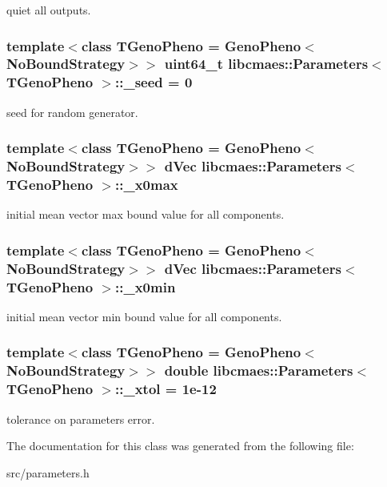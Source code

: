 quiet all outputs. \hypertarget{classlibcmaes_1_1Parameters_ac6d616c3d5295fec8a0b230592fb767a}{
\subsubsection[{\-\_\-seed}]{\setlength{\rightskip}{0pt plus 5cm}template$<$class T\-Geno\-Pheno = Geno\-Pheno$<$\-No\-Bound\-Strategy$>$$>$ uint64\-\_\-t {\bf libcmaes\-::\-Parameters}$<$ T\-Geno\-Pheno $>$\-::\-\_\-seed = 0}}\label{classlibcmaes_1_1Parameters_ac6d616c3d5295fec8a0b230592fb767a}
seed for random generator. \hypertarget{classlibcmaes_1_1Parameters_aece9694af9bee78bb13b0994db7ac45e}{
\subsubsection[{\-\_\-x0max}]{\setlength{\rightskip}{0pt plus 5cm}template$<$class T\-Geno\-Pheno = Geno\-Pheno$<$\-No\-Bound\-Strategy$>$$>$ d\-Vec {\bf libcmaes\-::\-Parameters}$<$ T\-Geno\-Pheno $>$\-::\-\_\-x0max}}\label{classlibcmaes_1_1Parameters_aece9694af9bee78bb13b0994db7ac45e}
initial mean vector max bound value for all components. \hypertarget{classlibcmaes_1_1Parameters_aa3bb27467698d9cb7fc7e0a83b48800f}{
\subsubsection[{\-\_\-x0min}]{\setlength{\rightskip}{0pt plus 5cm}template$<$class T\-Geno\-Pheno = Geno\-Pheno$<$\-No\-Bound\-Strategy$>$$>$ d\-Vec {\bf libcmaes\-::\-Parameters}$<$ T\-Geno\-Pheno $>$\-::\-\_\-x0min}}\label{classlibcmaes_1_1Parameters_aa3bb27467698d9cb7fc7e0a83b48800f}
initial mean vector min bound value for all components. \hypertarget{classlibcmaes_1_1Parameters_aaa9e8eedba7d7140d116163b40f653f8}{
\subsubsection[{\-\_\-xtol}]{\setlength{\rightskip}{0pt plus 5cm}template$<$class T\-Geno\-Pheno = Geno\-Pheno$<$\-No\-Bound\-Strategy$>$$>$ double {\bf libcmaes\-::\-Parameters}$<$ T\-Geno\-Pheno $>$\-::\-\_\-xtol = 1e-\/12}}\label{classlibcmaes_1_1Parameters_aaa9e8eedba7d7140d116163b40f653f8}
tolerance on parameters error. 

The documentation for this class was generated from the following file\-:\begin{DoxyCompactItemize}
\item 
src/parameters.\-h\end{DoxyCompactItemize}
